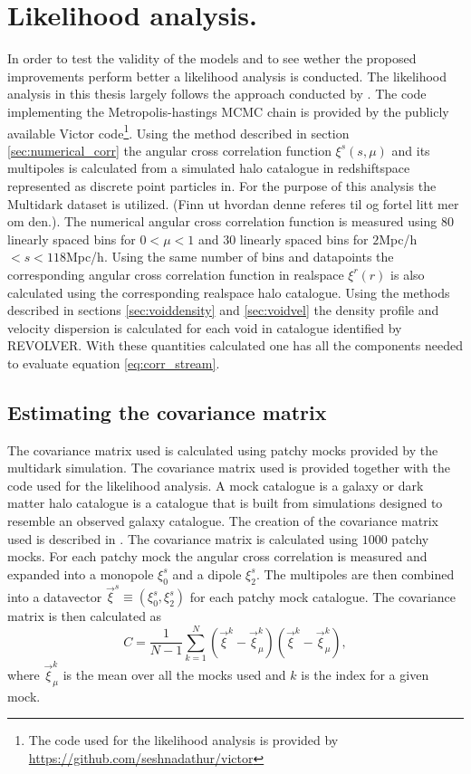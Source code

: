 \section{Likelihood analysis.}\label{sec:maximum_likelihood_method}
In order to test the validity of the models and to see wether the proposed improvements perform better a likelihood analysis is conducted. The likelihood analysis in this thesis largely follows the approach conducted by \cite{BeyondBAO}. The code implementing the Metropolis-hastings MCMC chain is provided by the publicly available Victor code\footnote{The code used for the likelihood analysis is provided by \url{https://github.com/seshnadathur/victor}}. Using the method described in section \ref{sec:numerical_corr} the angular cross correlation function $\xi^s(s,\mu)$ and its multipoles is calculated from a simulated halo catalogue in redshiftspace represented as discrete point particles in. For the purpose of this analysis the Multidark dataset is utilized. (Finn ut hvordan denne referes til og fortel litt mer om den.). The numerical angular cross correlation function  is measured using $80$ linearly spaced bins for $0<\mu<1$ and $30$ linearly spaced bins for $2$Mpc/h$<s<118$Mpc/h. Using the same number of bins and datapoints the corresponding angular cross correlation function in realspace $\xi^r(r)$ is also calculated using the corresponding realspace halo catalogue. Using the methods described in sections \ref{sec:voiddensity} and \ref{sec:voidvel} the density profile and velocity dispersion is calculated for each void in catalogue identified by REVOLVER. With these quantities calculated one has all the components needed to evaluate equation \ref{eq:corr_stream}.
\subsection{Estimating the covariance matrix}
The covariance matrix used is calculated using patchy mocks provided by the multidark simulation\cite{MDmock1}\cite{MDmock2}. The covariance matrix used is provided together with the code used for the likelihood analysis. A mock catalogue is a galaxy or dark matter halo catalogue is a catalogue that is built from simulations designed to resemble an observed galaxy catalogue. The creation of the covariance matrix used is described in \cite{BeyondBAO}. The covariance matrix is calculated using $1000$ patchy mocks. For each patchy mock the angular cross correlation is measured and expanded into a monopole $\xi_0^s$ and a dipole $\xi_2^s$. The multipoles are then combined into a datavector $\vec{\xi}^s\equiv(\xi_0^s, \xi_2^s)$ for each patchy mock catalogue. The covariance matrix is then calculated as
\begin{equation}
    C=\frac{1}{N-1}\sum_{k=1}^N(\vec{\xi} ^k-\vec{\xi}^k_\mu)(\vec{\xi}^k-\vec{\xi}^k_\mu),
\end{equation} 
where $\vec{\xi}^k_\mu$ is the mean over all the mocks used and $k$ is the index for a given mock.
